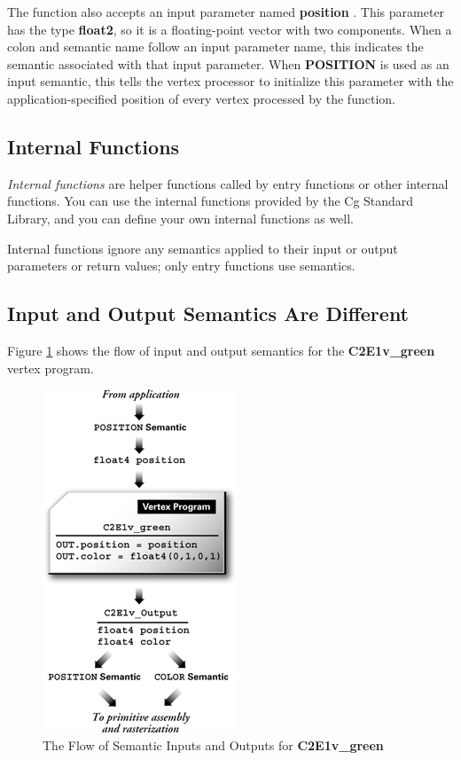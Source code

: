 \documentclass{book}
\begin{document}
The function also accepts an input parameter named \textbf{position} . This parameter has the type \textbf{float2}, so it is a floating-point vector with two components. When a colon and semantic name follow an input parameter name, this indicates the semantic associated with that input parameter. When \textbf{POSITION} is used as an input semantic, this tells the vertex processor to initialize this parameter with the application-specified position of every vertex processed by the function.

\subsection*{Internal Functions}

\textit{Internal functions} are helper functions called by entry functions or other internal functions. You can use the internal functions provided by the Cg Standard Library, and you can define your own internal functions as well.

Internal functions ignore any semantics applied to their input or output parameters or return values; only entry functions use semantics.

\subsection{Input and Output Semantics Are Different}

Figure \ref{fig:2-1} shows the flow of input and output semantics for the \textbf{C2E1v_green} vertex program.

\begin{figure}
    \centering
    \includegraphics[width=0.5\linewidth]{Images/fig2_1.jpg}
    \caption{The Flow of Semantic Inputs and Outputs for \textbf{C2E1v_green}}
    \label{fig:2-1}
\end{figure}
\end{document}
